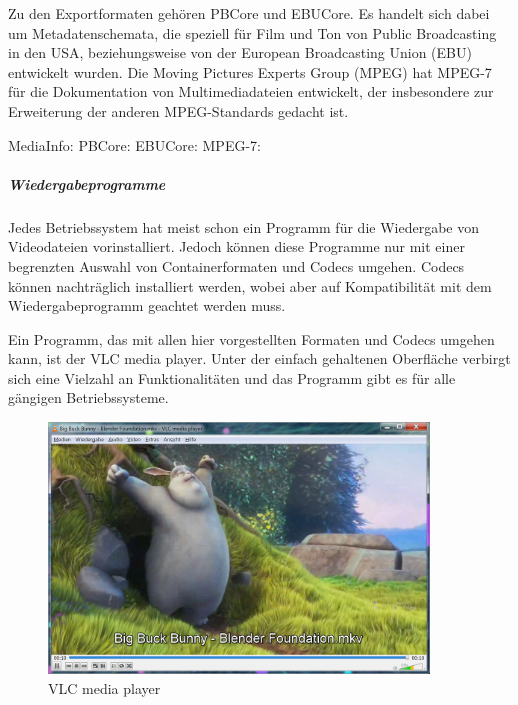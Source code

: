 Zu den Exportformaten gehören PBCore und EBUCore. Es handelt sich dabei um Metadatenschemata, die speziell für Film und Ton von Public Broadcasting in den USA, beziehungsweise von der European Broadcasting Union (EBU) entwickelt wurden. Die Moving Pictures Experts Group (MPEG) hat MPEG-7 für die Dokumentation von Multimediadateien entwickelt, der insbesondere zur Erweiterung der anderen MPEG-Standards gedacht ist.

\begin{flushleft}
	MediaInfo: 
	PBCore: 
	EBUCore: 
	MPEG-7: 
\end{flushleft}

\subparagraph{Wiedergabeprogramme} Jedes Betriebssystem hat meist schon ein Programm für die Wiedergabe von Videodateien vorinstalliert. Jedoch können diese Programme nur mit einer begrenzten Auswahl von Containerformaten und Codecs umgehen. Codecs können nachträglich installiert werden, wobei aber auf Kompatibilität mit dem Wiedergabeprogramm geachtet werden muss.

Ein Programm, das mit allen hier vorgestellten Formaten und Codecs umgehen kann, ist der VLC media player. Unter der einfach gehaltenen Oberfläche verbirgt sich eine Vielzahl an Funktionalitäten und das Programm gibt es für alle gängigen Betriebssysteme. 

\begin{figure}[!htp]
  \begin{center}
    \includegraphics[width=0.9\textwidth]{bilder/video_vlc}
  \end{center}
	\caption{VLC media player}
\end{figure}

